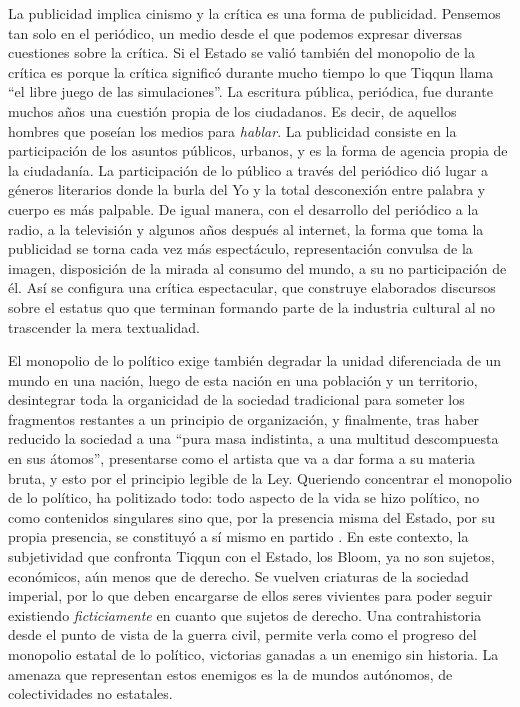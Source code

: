 La publicidad implica cinismo y la crítica es una forma de publicidad. Pensemos tan solo en el periódico, un medio desde el que podemos expresar diversas cuestiones sobre la crítica. Si el Estado se valió también del monopolio de la crítica es porque la crítica significó durante mucho tiempo lo que Tiqqun llama \enquote{el libre juego de las simulaciones}. La escritura pública, periódica, fue durante muchos años una cuestión propia de los ciudadanos. Es decir, de aquellos hombres que poseían los medios para \emph{hablar}. La publicidad consiste en la participación de los asuntos públicos, urbanos, y es la forma de agencia propia de la ciudadanía. La participación de lo público a través del periódico dió lugar a géneros literarios donde la burla del Yo y la total desconexión entre palabra y cuerpo es más palpable. De igual manera, con el desarrollo del periódico a la radio, a la televisión y algunos años después al internet, la forma que toma la publicidad se torna cada vez más espectáculo, representación convulsa de la imagen, disposición de la mirada al consumo del mundo, a su no participación de él. Así se configura una crítica espectacular, que construye elaborados discursos sobre el estatus quo que terminan formando parte de la industria cultural al no trascender la mera textualidad.

El monopolio de lo político exige también degradar la unidad diferenciada de un mundo en una nación, luego de esta nación en una población y un territorio, desintegrar toda la organicidad de la sociedad tradicional para someter los fragmentos restantes a un principio de organización, y finalmente, tras haber reducido la sociedad a una \enquote{pura masa indistinta, a una multitud descompuesta en sus átomos}, presentarse como el artista que va a dar forma a su materia bruta, y esto por el principio legible de la Ley. Queriendo concentrar el monopolio de lo político, ha politizado todo: todo aspecto de la vida se hizo político, no como contenidos singulares sino que, por la presencia misma del Estado, por su propia presencia, se constituyó a sí mismo en partido \autocite{tiqqunIntroduccionGuerraCivil2008}. En este contexto, la subjetividad que confronta Tiqqun con el Estado, los Bloom, ya no son sujetos, económicos, aún menos que de derecho. Se vuelven criaturas de la sociedad imperial, por lo que deben encargarse de ellos  seres vivientes para poder seguir existiendo \emph{ficticiamente} en cuanto que sujetos de derecho. Una contrahistoria desde el punto de vista de la guerra civil, permite verla como el progreso del monopolio estatal de lo político, victorias ganadas a un enemigo sin historia. La amenaza que representan estos enemigos es la de mundos autónomos, de colectividades no estatales.

